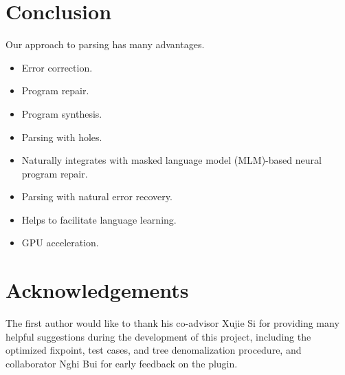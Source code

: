 \documentclass[sigplan,nonacm]{acmart}\settopmatter{printfolios=false,printccs=false,printacmref=false}
\begin{document}
\section{Conclusion}

Our approach to parsing has many advantages.

\begin{itemize}
\item Error correction.
\item Program repair.
\item Program synthesis.
\item Parsing with holes.
\item Naturally integrates with masked language model (MLM)-based neural program repair.
\item Parsing with natural error recovery.
\item Helps to facilitate language learning.
\item GPU acceleration.
\end{itemize}

\section{Acknowledgements}
The first author would like to thank his co-advisor Xujie Si for providing many helpful suggestions during the development of this project, including the optimized fixpoint, test cases, and tree denomalization procedure, and collaborator Nghi Bui for early feedback on the plugin.


\end{document}
